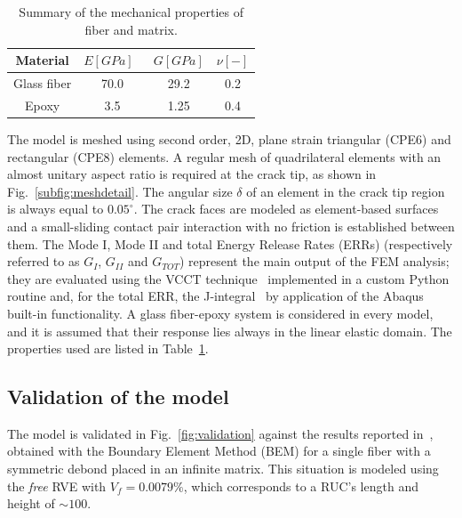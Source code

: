 \documentclass[review]{elsarticle}
\begin{document}
\begin{table}[!htbp]
 \centering
 \caption{Summary of the mechanical properties of fiber and matrix.}
 \begin{tabular}{cccc}
\textbf{Material} & \textbf{$E\left[GPa\right]$}\ & \textbf{$G\left[GPa\right]$} & \textbf{$\nu\left[-\right]$} \\
\midrule
Glass fiber    & 70.0  & 29.2   & 0.2  \\
Epoxy    & 3.5    & 1.25   & 0.4
\end{tabular}
\label{tab:phaseprop}
\end{table}

The model is meshed using second order, 2D, plane strain triangular (CPE6) and rectangular (CPE8) elements. A regular mesh of quadrilateral elements with an almost unitary aspect ratio is required at the crack tip, as shown in Fig.~\ref{subfig:meshdetail}. The angular size $\delta$ of an element in the crack tip region is always equal to $0.05^{\circ}$. The crack faces are modeled as element-based surfaces and a small-sliding contact pair interaction with no friction is established between them. The Mode I, Mode II and total Energy Release Rates (ERRs) (respectively referred to as $G_{I}$, $G_{II}$ and $G_{TOT}$) represent the main output of the FEM analysis; they are evaluated using the VCCT technique~\cite{Krueger2004} implemented in a custom Python routine and, for the total ERR, the J-integral~\cite{Rice1968} by application of the Abaqus built-in functionality. A glass fiber-epoxy system is considered in every model, and it is assumed that their response lies always in the linear elastic domain. The properties used are listed in Table~\ref{tab:phaseprop}.

\subsection{Validation of the model}

The model is validated in Fig.~\ref{fig:validation} against the results reported in~\cite{Sandino2016}, obtained with the Boundary Element Method (BEM) for a single fiber with a symmetric debond placed in an infinite matrix. This situation is modeled using the \textit{free} RVE with $V_{f}=0.0079\%$, which corresponds to a RUC's length and height of $\sim 100$.
\end{document}
